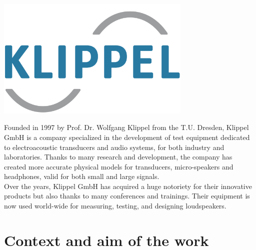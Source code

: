 \documentclass{report}
\begin{document}
\begin{minipage}{0.35\textwidth}
\centering
	\includegraphics[width=0.7\textwidth]{Preface/logo_klippel} 
    \captionsetup{hypcap=false} 
	\label{fig:lolo_klippel}
\end{minipage}
\begin{minipage}{0.65\textwidth}
Founded in 1997 by Prof. Dr. Wolfgang Klippel from the T.U. Dresden, Klippel GmbH is a company specialized in the development of test equipment dedicated to electroacoustic transducers and audio systems, for both industry and laboratories. Thanks to many research and development, the company has created more accurate physical models for transducers, micro-speakers and headphones, valid for both small and large signals.  \\
Over the years, Klippel GmbH has acquired a huge notoriety for their innovative products but also thanks to many conferences and trainings. Their equipment is now used world-wide for measuring, testing, and designing loudspeakers.
\end{minipage}


    
\section{Context and aim of the work}
\end{document}
